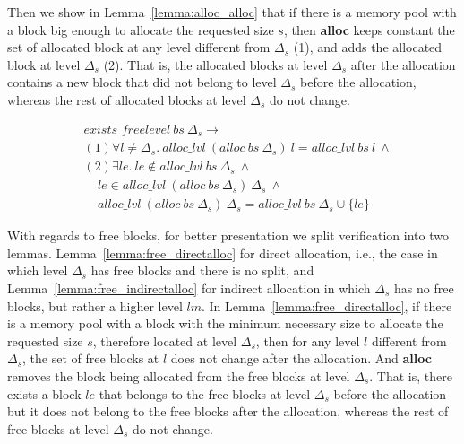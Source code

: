 Then we show in Lemma~\ref{lemma:alloc_alloc} that if there is a memory pool with a block big enough to allocate the requested size $s$, then \textbf{alloc} keeps constant the set of allocated block at any level different from $\Delta_s$ (1), and adds the allocated block at level $\Delta_s$ (2). That is, the allocated blocks at level $\Delta_s$ after the allocation contains a new block that did not belong to level $\Delta_s$ before the allocation, whereas the rest of allocated blocks at level $\Delta_s$ do not change.

\begin{lemma} 
\label{lemma:alloc_alloc}
\begin{align*}
&exists\_freelevel\ bs\  \Delta_s \longrightarrow \\
&(1)\forall l \ne \Delta_s.\ alloc\_lvl\ (alloc\ bs\ \Delta_s)\ l = alloc\_lvl\ bs\ l\ \wedge\\
&(2)\exists le.\ le \notin alloc\_lvl\ bs\ \Delta_s\ \wedge\\
&\ \ \ \ \ le \in alloc\_lvl\ (alloc\ bs\ \Delta_s)\ \Delta_s\ \wedge\\
&\ \ \ \ \ alloc\_lvl\ (alloc\ bs\ \Delta_s)\ \Delta_s = alloc\_lvl\ bs\ \Delta_s \cup \lbrace le \rbrace
\end{align*}
\end{lemma}

With regards to free blocks, for better presentation we split verification into two lemmas. Lemma~\ref{lemma:free_directalloc} for direct allocation, i.e., the case in which level $\Delta_s$ has free blocks and there is no split, and Lemma~\ref{lemma:free_indirectalloc} for indirect allocation in which $\Delta_s$ has no free blocks, but rather a higher level $lm$. In Lemma~\ref{lemma:free_directalloc}, if there is a memory pool with a block with the minimum necessary size to allocate the requested size $s$, therefore located at level $\Delta_s$, then for any level $l$ different from $\Delta_s$, the set of free blocks at $l$ does not change after the allocation. And \textbf{alloc} removes the block being allocated from the free blocks at level $\Delta_s$. That is, there exists a block $le$ that belongs to the free blocks at level $\Delta_s$ before the allocation but it does not belong to the free blocks after the allocation, whereas the rest of free blocks at level $\Delta_s$ do not change.

